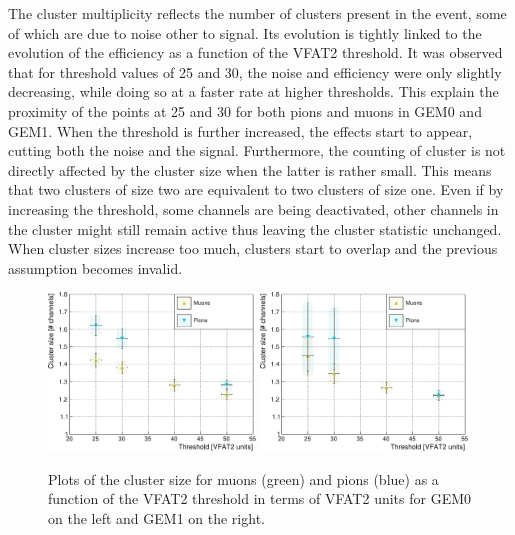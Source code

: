       The cluster multiplicity reflects the number of clusters present in the event, some of which are due to noise other to signal. Its evolution is tightly linked to the evolution of the efficiency as a function of the VFAT2 threshold. It was observed that for threshold values of 25 and 30, the noise and efficiency were only slightly decreasing, while doing so at a faster rate at higher thresholds. This explain the proximity of the points at 25 and 30 for both pions and muons in GEM0 and GEM1. When the threshold is further increased, the effects start to appear, cutting both the noise and the signal. Furthermore, the counting of cluster is not directly affected by the cluster size when the latter is rather small. This means that two clusters of size two are equivalent to two clusters of size one. Even if by increasing the threshold, some channels are being deactivated, other channels in the cluster might still remain active thus leaving the cluster statistic unchanged. When cluster sizes increase too much, clusters start to overlap and the previous assumption becomes invalid. \\

      \begin{figure}[h!]
        \centering
        \includegraphics[width=0.49\textwidth]{img/plots/cClusterSize_Threshold_GEM0-crop}
        \includegraphics[width=0.49\textwidth]{img/plots/cClusterSize_Threshold_GEM1-crop}
        \caption{Plots of the cluster size for muons (green) and pions (blue) as a function of the VFAT2 threshold in terms of VFAT2 units for GEM0 on the left and GEM1 on the right.}
        \label{fig:II-3-data-clu-size}
      \end{figure}

